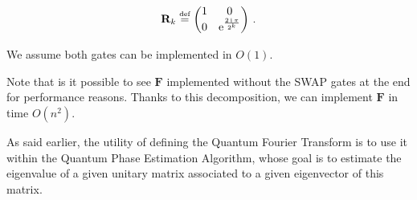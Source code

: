 \documentclass[11pt, a4paper]{article}
\begin{document}
\begin{definition}
                    \[\mathbf{R}_k\overset{\text{\tiny{def}}}{=}\begin{pmatrix}1 & 0\\0 & \mathrm{e}^{\frac{2\,\mathrm{i}\,\pi}{2^k}}\end{pmatrix}\,.\]
                    
                    We assume both gates can be implemented in \(O(1)\).
                    
                    Note that is it possible to see \(\mathbf{F}\) implemented without the SWAP gates at the end for performance reasons. Thanks to this decomposition, we can implement \(\mathbf{F}\) in time \(O\left(n^2\right)\).
                \end{definition}
                
                As said earlier, the utility of defining the Quantum Fourier Transform is to use it within the Quantum Phase Estimation Algorithm, whose goal is to estimate the eigenvalue of a given unitary matrix associated to a given eigenvector of this matrix.
                
\end{document}
